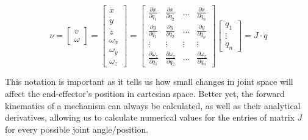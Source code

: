 \begin{equation}\label{eq:kinematics:diff}
\nu = \left[\begin{array}{c}v\\\omega\end{array}\right]=
\left[\begin{array}{c}\dot{x}\\
\dot{y}\\
\dot{z}\\
\omega_x\\
\omega_y\\
\omega_z\end{array}\right]=
\left[\begin{array}{cccc}\frac{\partial{x}}{\partial{q_1}} & \frac{\partial{x}}{\partial{q_2}} & \ldots & \frac{\partial{x}}{\partial{q_n}}\\\frac{\partial{y}}{\partial{q_1}} & \frac{\partial{y}}{\partial{q_2}} & \ldots & \frac{\partial{y}}{\partial{q_n}}\\\vdots & \vdots & \vdots & \vdots\\\frac{\partial{\omega_z}}{\partial{q_1}} & \frac{\partial{\omega_z}}{\partial{q_2}} & \ldots & \frac{\partial{\omega_z}}{\partial{q_n}}\end{array}\right]\left[\begin{array}{c}q_1\\\vdots\\q_n\end{array}\right] = J \cdot \dot{q}
\end{equation}

This notation is important as it tells us how small changes in joint space will affect the end-effector's position in cartesian space. Better yet, the forward kinematics of a mechanism can always be calculated, as well as their analytical derivatives, allowing us to calculate numerical values for the entries of matrix $J$ for every possible joint angle/position.

